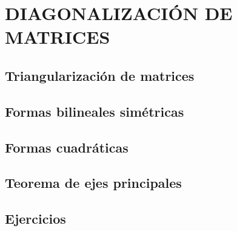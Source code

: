 \chapter{DIAGONALIZACIÓN DE MATRICES}
\printchaptertableofcontents

\section{Triangularización de matrices}

\section{Formas bilineales simétricas}

\section{Formas cuadráticas}

\section{Teorema de ejes principales}

\section{Ejercicios}